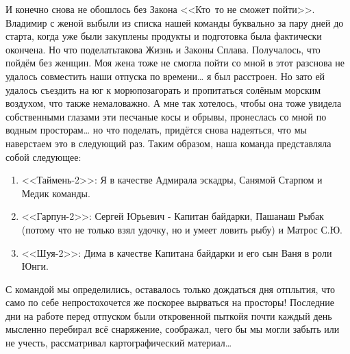 И конечно снова не обошлось без Закона <<Кто\sdash~то не сможет пойти>>. Владимир с женой выбыли из списка нашей команды буквально за пару дней до старта, когда уже были закуплены продукты и подготовка была фактически окончена. Но что поделать\mdash такова Жизнь и Законы Сплава. Получалось, что пойдём без женщин. Моя жена тоже не смогла пойти со мной в этот раз\mdash снова не удалось совместить наши отпуска по времени… я был расстроен. Но зато ей удалось съездить на юг к морю\mdash позагорать и пропитаться солёным морским воздухом, что также немаловажно. А мне так хотелось, чтобы она тоже увидела собственными глазами эти песчаные косы и обрывы, пронеслась со мной по водным просторам… но что поделать, придётся снова надеяться, что мы наверстаем это в следующий раз. 
Таким образом, наша команда представляла собой следующее:
\begin{enumerate}
	\item <<Таймень-2>>: Я в качестве Адмирала эскадры, Саня\mdash мой Старпом и Медик команды.
	\item <<Гарпун-2>>: Сергей Юрьевич - Капитан байдарки, Паша\mdash наш Рыбак (потому что не только взял удочку, но и умеет ловить рыбу) и Матрос С.Ю.
	\item <<Шуя-2>>: Дима в качестве Капитана байдарки и его сын Ваня в роли Юнги.
\end{enumerate}

С командой мы определились, оставалось только дождаться дня отплытия, что само по себе непросто\mdash хочется же поскорее вырваться на просторы! Последние дни на работе перед отпуском были откровенной пыткой\mdash я почти каждый день мысленно перебирал всё снаряжение, соображал, чего бы мы могли забыть или не учесть, рассматривал картографический материал\ldots

\begin{center}
\end{center}
